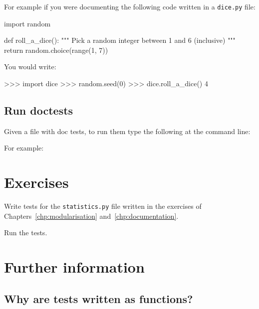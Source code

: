 For example if you were documenting the following code written in a \texttt{dice.py}
file:

\begin{python}
import random


def roll_a_dice():
    """
    Pick a random integer between 1 and 6 (inclusive)
    """
    return random.choice(range(1, 7))
\end{python}


You would write:

\begin{md}
>>> import dice
>>> random.seed(0)
>>> dice.roll_a_dice()
4

\end{md}


\subsection{Run doctests}
\label{\detokenize{building-tools/07-testing/how/main:how-to-run-doctests}}

Given a file with doc tests, to run them type the following at the
command line:





For example:





\section{Exercises}
\label{\detokenize{building-tools/07-testing/exercises/main:exercises}}\label{\detokenize{building-tools/07-testing/exercises/main::doc}}

Write tests for the \texttt{statistics.py} file written in the exercises of
Chapters~\ref{chp:modularisation} and~\ref{chp:documentation}.


Run the tests.



\section{Further information}

\subsection{Why are tests written as functions?}

